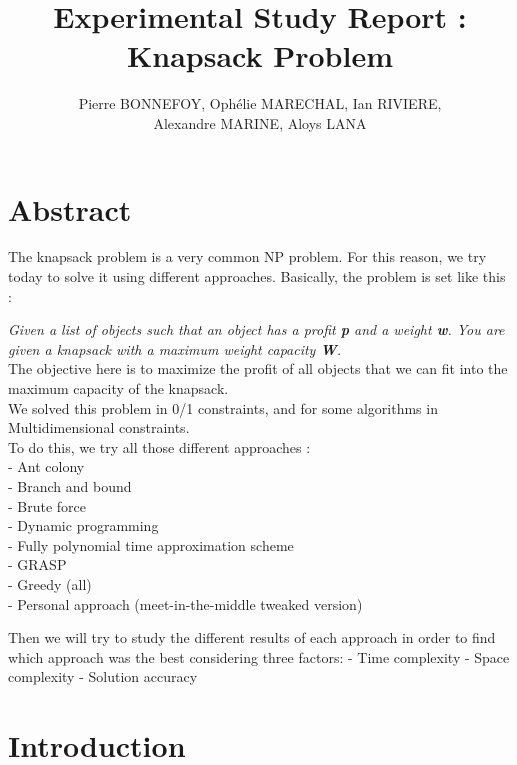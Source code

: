 \documentclass[a4paper, 11pt]{article}
\title{Experimental Study Report : Knapsack Problem}
\author{Pierre BONNEFOY, Ophélie MARECHAL, Ian RIVIERE,\\
        Alexandre MARINE, Aloys LANA}
\begin{document}
\maketitle


\section{Abstract}

The knapsack problem is a very common NP problem. For this reason, we try today to solve it using different approaches. Basically, the problem is set like this :\par
\textit{Given a list of objects such that an object has a profit \textbf{p} and a weight \textbf{w}. You are given a knapsack with a maximum weight capacity \textbf{W}.} \\
The objective here is to maximize the profit of all objects that we can fit into the maximum capacity of the knapsack.\\
We solved this problem in 0/1 constraints, and for some algorithms in Multidimensional constraints.\\
To do this, we try all those different approaches :\\
\tabto{1.5cm} - Ant colony\\
\tabto{1.5cm} - Branch and bound\\
\tabto{1.5cm} - Brute force\\
\tabto{1.5cm} - Dynamic programming\\
\tabto{1.5cm} - Fully polynomial time approximation scheme\\
\tabto{1.5cm} - GRASP\\
\tabto{1.5cm} - Greedy (all)\\
\tabto{1.5cm} - Personal approach (meet-in-the-middle tweaked version)\par 
Then we will try to study the different results of each approach in order to find which approach was the best considering three factors:
\tabto{1.5cm} - Time complexity
\tabto{1.5cm} - Space complexity
\tabto{1.5cm} - Solution accuracy

\newpage

\tableofcontents



\section{Introduction}
\end{document}
